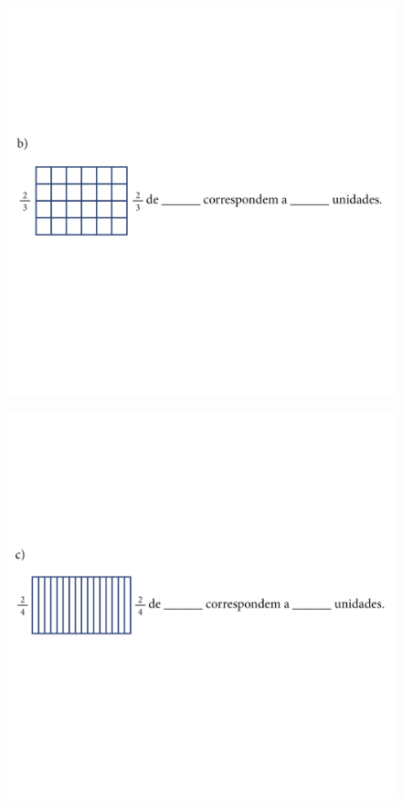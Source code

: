 \begin{figure}[htpb!]
\includegraphics[width=\textwidth]{../ilustracoes/MAT5/SAEB_5ANO_MAT_figura74-2.png}
\end{figure}

\begin{figure}[htpb!]
\includegraphics[width=\textwidth]{../ilustracoes/MAT5/SAEB_5ANO_MAT_figura74-3.png}
\end{figure}

